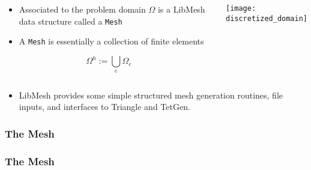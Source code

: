 \begin{frame}
  \begin{columns}[t]
    \begin{block}{}%
      \begin{itemize}
      \item{
	Associated to the problem domain $\Omega$ is a LibMesh data
	structure called a \texttt{Mesh}
      }
	
      \item{A \texttt{Mesh} is essentially
	a collection of finite elements}
      \end{itemize}
      \begin{equation}
	\label{eqn:discretized_domain}
	\nonumber
	\Omega^h:=\bigcup_e \Omega_e
      \end{equation}
    \end{block}
      \begin{center}
	\texttt{[image: discretized\_domain]}
      \end{center}
  \end{columns}
  {
  \begin{itemize}
    \item{LibMesh provides some simple structured mesh generation
routines, file inputs, and interfaces to Triangle and TetGen.}
  \end{itemize}
  }
\end{frame}

\begin{frame}[shrink]
  \frametitle{The Mesh}  
  
\end{frame}


\begin{frame}[shrink]
  \frametitle{The Mesh}  
  
\end{frame}
